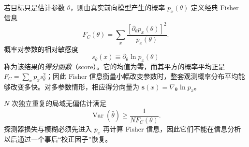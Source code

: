 若目标只是估计参数 $\theta$，则由真实前向模型产生的概率 $p_x(\theta)$ 定义经典 Fisher 信息
\begin{equation}
\boxed{
F_C(\theta)=\sum_x\frac{[\partial_\theta p_x(\theta)]^2}{p_x(\theta)}.}
\label{eq:classical_fisher_information_definition}
\end{equation}
概率对参数的相对敏感度
\begin{equation*}
s_\theta(x)\equiv\partial_\theta\ln p_x(\theta)
\end{equation*}
称为该结果的\emph{得分函数}（score）。它的均值为零，而其平方的概率平均正是 $F_C=\sum_xp_xs_\theta^2$；因此 Fisher 信息衡量小幅改变参数时，整套观测概率分布平均能够改变多快。对多参数情形，相应得分向量为 $\mathbf s(x)=\nabla_{\boldsymbol\theta}\ln p_x$。

$N$ 次独立重复的局域无偏估计满足
\begin{equation}
\boxed{
\operatorname{Var}(\hat\theta)\ge\frac1{N F_C(\theta)}.}
\label{eq:classical_cramer_rao_general}
\end{equation}
探测器损失与模糊必须先进入 $p_x$ 再计算 Fisher 信息，因此它们不能在信息分析以后通过一个事后“校正因子”恢复。

